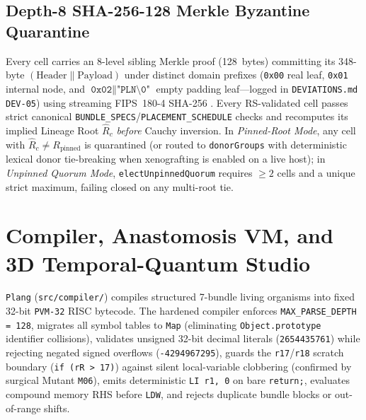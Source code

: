 \documentclass[11pt,letterpaper]{article}
\theoremstyle{remark}
\begin{document}
\subsection{Depth-8 SHA-256-128 Merkle Byzantine Quarantine}
Every cell carries an 8-level sibling Merkle proof (128~bytes) committing its 348-byte $(\text{Header}\parallel\text{Payload})$ under distinct domain prefixes (\texttt{0x00} real leaf, \texttt{0x01} internal node, and $\texttt{0x02}\parallel\texttt{"PLN\textbackslash 0"}$ empty padding leaf---logged in \texttt{DEVIATIONS.md} \texttt{DEV-05}) using streaming FIPS~180-4 SHA-256 \cite{merkle1987,fips180}. Every RS-validated cell passes strict canonical \texttt{BUNDLE\_\allowbreak SPECS}/\allowbreak\texttt{PLACEMENT\_\allowbreak SCHEDULE} checks and recomputes its implied Lineage Root $\hat{R}_c$ \emph{before} Cauchy inversion. In \emph{Pinned-Root Mode}, any cell with $\hat{R}_c \neq R_{\text{pinned}}$ is quarantined (or routed to \texttt{donorGroups} with deterministic lexical donor tie-breaking when xenografting is enabled on a live host); in \emph{Unpinned Quorum Mode}, \texttt{elect\allowbreak Unpinned\allowbreak Quorum} requires $\ge 2$ cells and a unique strict maximum, failing closed on any multi-root tie.

\section{Compiler, Anastomosis VM, and 3D Temporal-Quantum Studio}
\label{sec:vm}

\texttt{Plang} (\texttt{src/compiler/}) compiles structured 7-bundle living organisms into fixed 32-bit \texttt{PVM-32} RISC bytecode. The hardened compiler enforces \texttt{MAX\_\allowbreak PARSE\_\allowbreak DEPTH = 128}, migrates all symbol tables to \texttt{Map} (eliminating \texttt{Object.\allowbreak prototype} identifier collisions), validates unsigned 32-bit decimal literals (\texttt{2654435761}) while rejecting negated signed overflows (\texttt{-4294967295}), guards the \texttt{r17}/\texttt{r18} scratch boundary (\texttt{if (rR > 17)}) against silent local-variable clobbering (confirmed by surgical Mutant \texttt{M06}), emits deterministic \texttt{LI r1, 0} on bare \texttt{return;}, evaluates compound memory RHS before \texttt{LDW}, and rejects duplicate bundle blocks or out-of-range shifts.
\end{document}
